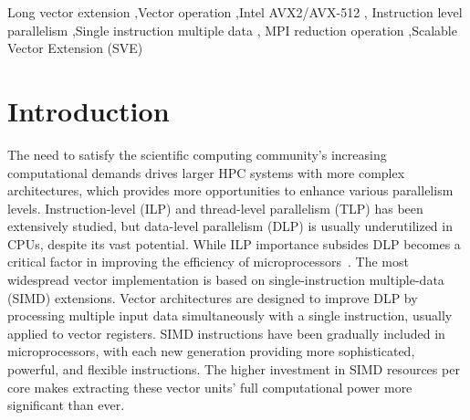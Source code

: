 \documentclass[5p,times,twocolumn]{elsarticle}
\begin{document}
\begin{keyword}
Long vector extension \sep Vector operation \sep Intel AVX2/AVX-512 \sep
Instruction level parallelism \sep Single instruction multiple data \sep
MPI reduction operation \sep Scalable Vector Extension (SVE)
\end{keyword}

\maketitle

\section{Introduction}\label{sec:intro}
The need to satisfy the scientific computing community's increasing
computational demands drives larger HPC systems with more complex architectures,
which provides more opportunities to enhance various parallelism levels.
%
Instruction-level (ILP) and thread-level parallelism (TLP) has been extensively
studied, but data-level parallelism (DLP) is usually underutilized in CPUs, despite its vast potential.
While ILP importance subsides DLP becomes a critical
factor in improving the efficiency of
microprocessors~\cite{energyeffects, HardwareEvents, espasa1998vector, Watson1972TheTA, clusterefficiency}.
The most widespread vector implementation is based on single-instruction multiple-data (SIMD) extensions.
Vector architectures are designed to improve DLP by processing multiple input data simultaneously with a single instruction, usually applied to vector registers.
SIMD instructions have been gradually included in
microprocessors, with each new generation providing more sophisticated, powerful, and flexible
instructions. The higher investment in SIMD resources per core makes extracting
these vector units' full computational power more significant than ever.
\end{document}

